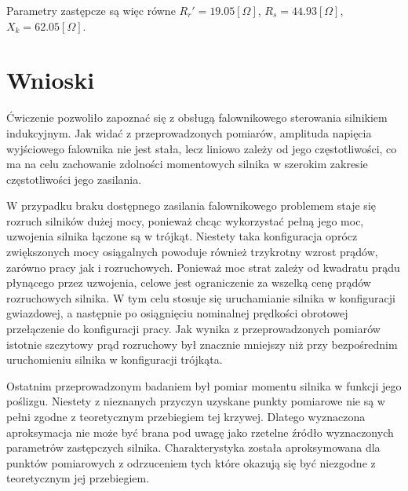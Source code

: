 \documentclass[12pt]{article}
\begin{document}
Parametry zastępcze są więc równe $R_r'=19.05[\Omega]$, $R_s=44.93[\Omega]$,
$X_k=62.05[\Omega]$.

\section{Wnioski}

Ćwiczenie pozwoliło zapoznać się z obsługą falownikowego sterowania silnikiem
indukcyjnym. Jak widać z przeprowadzonych pomiarów, amplituda napięcia
wyjściowego falownika nie jest stała, lecz liniowo zależy od jego
częstotliwości, co ma na celu zachowanie zdolności momentowych silnika w
szerokim zakresie częstotliwości jego zasilania.

W przypadku braku dostępnego zasilania falownikowego problemem staje się rozruch
silników dużej mocy, ponieważ chcąc wykorzystać pełną jego moc, uzwojenia
silnika łączone są w trójkąt. Niestety taka konfiguracja oprócz zwiększonych
mocy osiągalnych powoduje również trzykrotny wzrost prądów, zarówno pracy jak i
rozruchowych. Ponieważ moc strat zależy od kwadratu prądu płynącego przez
uzwojenia, celowe jest ograniczenie za wszelką cenę prądów rozruchowych silnika.
W tym celu stosuje się uruchamianie silnika w konfiguracji gwiazdowej, a
następnie po osiągnięciu nominalnej prędkości obrotowej przełączenie do
konfiguracji pracy. Jak wynika z przeprowadzonych pomiarów istotnie szczytowy
prąd rozruchowy był znacznie mniejszy niż przy bezpośrednim uruchomieniu silnika
w konfiguracji trójkąta.

Ostatnim przeprowadzonym badaniem był pomiar momentu silnika w funkcji jego
poślizgu. Niestety z nieznanych przyczyn uzyskane punkty pomiarowe nie są w
pełni zgodne z teoretycznym przebiegiem tej krzywej. Dlatego wyznaczona
aproksymacja nie może być brana pod uwagę jako rzetelne źródło wyznaczonych
parametrów zastępczych silnika. Charakterystyka została aproksymowana dla
punktów pomiarowych z odrzuceniem tych które okazują się być niezgodne z
teoretycznym jej przebiegiem.
\end{document}

